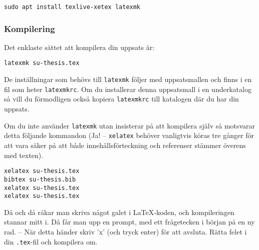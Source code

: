 \begin{verbatim}
sudo apt install texlive-xetex latexmk
\end{verbatim}


\subsubsection{Kompilering}

Det enklaste sättet att kompilera din uppsats är:

\begin{verbatim}
latexmk su-thesis.tex
\end{verbatim}

De inställningar som behövs till \texttt{latexmk} följer med uppsatsmallen och
finns i en fil som heter \texttt{latexmkrc}. Om du installerar denna
uppsatsmall i en underkatalog så vill du förmodligen också kopiera
\texttt{latexmkrc} till katalogen där du har din uppsats.

Om du inte använder \texttt{latexmk} utan insisterar på att kompilera
själv så motsvarar detta följande kommandon (Ja! -- \texttt{xelatex} behöver
vanligtvis köras tre gånger för att vara säker på att både innehållsförteckning
och referenser stämmer överens med texten).

\begin{verbatim}
xelatex su-thesis.tex
bibtex su-thesis.bib
xelatex su-thesis.tex
xelatex su-thesis.tex
\end{verbatim}

\noindent Då och då råkar man skriva något galet i \LaTeX{}-koden, och
kompileringen stannar mitt i. Då får man upp en prompt, med ett frågetecken i
början på en ny rad. -- När detta händer skriv 'x' (och tryck enter) för att
avsluta. Rätta felet i din \texttt{.tex}-fil och kompilera om.


